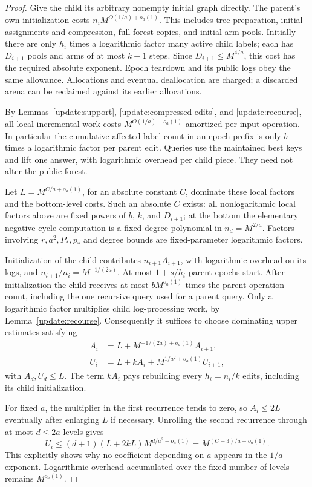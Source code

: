 \begin{proof}
Give the child its arbitrary nonempty initial graph directly.
The parent's own initialization costs
$n_iM^{O(1/a)+o_a(1)}$.  This includes tree preparation, initial
assignments and compression, full forest copies, and initial
arm pools.  Initially there are only $h_i$ times a logarithmic
factor many active child labels; each has $D_{i+1}$ pools and
arms of at most $k+1$ steps.  Since $D_{i+1}\le M^{4/a}$, this
cost has the required absolute exponent.  Epoch teardown and its
public logs obey the same allowance.  Allocations and eventual
deallocation are charged; a discarded arena can be reclaimed
against its earlier allocations.

By Lemmas~\ref{update:support}, \ref{update:compressed-edits},
and \ref{update:recourse}, all local incremental work costs
$M^{O(1/a)+o_a(1)}$ amortized per input operation.  In particular
the cumulative affected-label count in an epoch prefix is only
$b$ times a logarithmic factor per parent edit.  Queries use
the maintained best keys and lift one answer, with logarithmic
overhead per child piece.  They need not alter the public forest.

Let $L=M^{C/a+o_a(1)}$, for an absolute constant $C$, dominate
these local factors and the bottom-level costs.  Such an absolute
$C$ exists: all nonlogarithmic local factors above are fixed
powers of $b$, $k$, and $D_{i+1}$; at the bottom the elementary
negative-cycle computation is a fixed-degree polynomial in
$n_d=M^{2/a}$.  Factors involving $r,a^2,P_*,p_*$ and degree
bounds are fixed-parameter logarithmic factors.

Initialization of the child contributes $n_{i+1}A_{i+1}$,
with logarithmic overhead on its logs, and
$n_{i+1}/n_i=M^{-1/(2a)}$.  At most $1+s/h_i$ parent epochs
start.  After initialization the child receives at most
$bM^{o_a(1)}$ times the parent operation count, including the
one recursive query used for a parent query.  Only a
logarithmic factor multiplies child log-processing work, by
Lemma~\ref{update:recourse}.  Consequently it suffices to choose
dominating upper estimates satisfying
\begin{align}
 A_i&=L+M^{-1/(2a)+o_a(1)}A_{i+1},\\
 U_i&=L+kA_i+M^{1/a^2+o_a(1)}U_{i+1},
 \label{update:time-recurrences}
\end{align}
with $A_d,U_d\le L$.  The term $kA_i$ pays rebuilding every
$h_i=n_i/k$ edits, including its child initialization.

For fixed $a$, the multiplier in the first recurrence tends to
zero, so $A_i\le2L$ eventually after enlarging $L$ if necessary.
Unrolling the second recurrence through at most $d\le2a$ levels
gives
\[
 U_i\le (d+1)(L+2kL)
       M^{d/a^2+o_a(1)}
       =M^{(C+3)/a+o_a(1)}.
\]
This explicitly shows why no coefficient depending on $a$
appears in the $1/a$ exponent.  Logarithmic overhead accumulated
over the fixed number of levels remains $M^{o_a(1)}$.


\end{proof}
